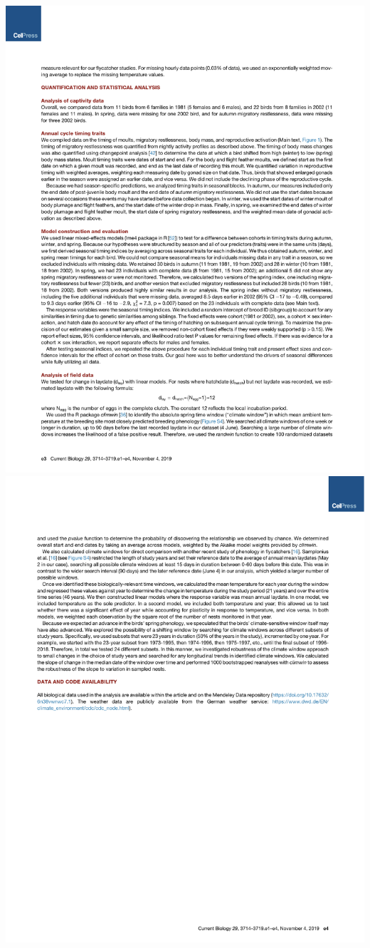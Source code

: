 \documentclass[a4paper, twoside]{templates/ociamthesis}
\begin{document}
\includegraphics[width=1\linewidth]{pdf_chapters/pied/pied_crop_Part09}
\includegraphics[width=1\linewidth]{pdf_chapters/pied/pied_crop_Part10}
\end{document}
